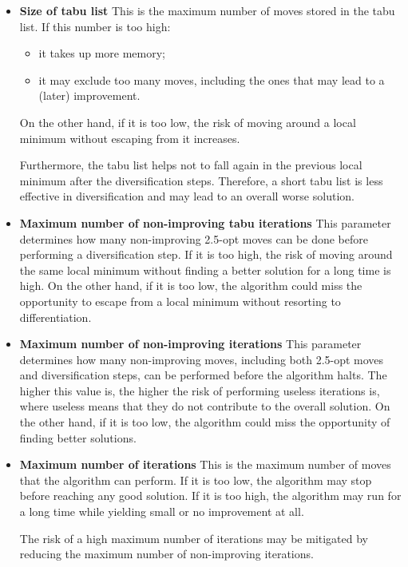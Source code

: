 \documentclass{article}
\begin{document}
\begin{itemize}
    \item \textbf{Size of tabu list}
          This is the maximum number of moves stored in the tabu list.
          If this number is too high:
          \begin{itemize}
              \item it takes up more memory;
              \item it may exclude too many moves, including the ones that may lead to a (later) improvement.
          \end{itemize}
          On the other hand, if it is too low, the risk of moving around a local minimum without escaping from it increases.

          Furthermore, the tabu list helps not to fall again in the previous local minimum after the diversification steps. Therefore, a short tabu list is less effective in diversification and may lead to an overall worse solution.

    \item \textbf{Maximum number of non-improving tabu iterations}
          This parameter determines how many non-improving 2.5-opt moves can be done before performing a diversification step.
          If it is too high, the risk of moving around the same local minimum without finding a better solution for a long time is high.
          On the other hand, if it is too low, the algorithm could miss the opportunity to escape from a local minimum without resorting to differentiation.

    \item \textbf{Maximum number of non-improving iterations}
          This parameter determines how many non-improving moves, including both 2.5-opt moves and diversification steps, can be performed before the algorithm halts.
          The higher this value is, the higher the risk of performing useless iterations is, where useless means that they do not contribute to the overall solution.
          On the other hand, if it is too low, the algorithm could miss the opportunity of finding better solutions.

    \item \textbf{Maximum number of iterations}
          This is the maximum number of moves that the algorithm can perform.
          If it is too low, the algorithm may stop before reaching any good solution.
          If it is too high, the algorithm may run for a long time while yielding small or no improvement at all.

          The risk of a high maximum number of iterations may be mitigated by reducing the maximum number of non-improving iterations.
\end{itemize}
\end{document}
